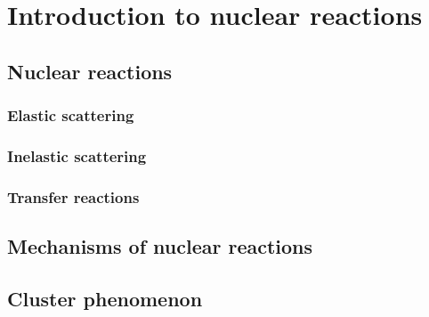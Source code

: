 
\chapter{Introduction to nuclear reactions} %

\label{Chapter1} %


\newcommand{\keyword}[1]{\textbf{#1}}
\newcommand{\tabhead}[1]{\textbf{#1}}
\newcommand{\code}[1]{\texttt{#1}}
\newcommand{\file}[1]{\texttt{\bfseries#1}}
\newcommand{\option}[1]{\texttt{\itshape#1}}


\section{Nuclear reactions}

\subsection{Elastic scattering}
\subsection{Inelastic scattering}
\subsection{Transfer reactions}

\section{Mechanisms of nuclear reactions}
\section{Cluster phenomenon}


